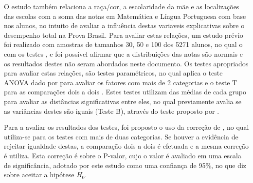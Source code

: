 O estudo também relaciona a raça/cor, a escolaridade da mãe e as localizações das escolas com a soma das notas em Matemática 
e Língua Portuguesa com base nos alunos, no intuito de avaliar a influência destas variaveis explicativas sobre o desempenho
total na Prova Brasil. Para avaliar estas relações, um estudo prévio foi realizado com amostras de tamanhos 30, 50 e 100 dos 5271
alunos, no qual o com os testes ,  e 
foi possivel afirmar que a distribuições das notas são normais e os resultados destes não seram abordados neste documento. Os testes 
apropriados para avaliar estas relações, são testes paramétricos, no qual aplica o teste ANOVA dado por  para 
avaliar os fatores com mais de 2 categorias e o teste T para as comparações dois a dois \cite{o1908student}.
Estes testes utilizam das médias de cada grupo para avaliar as distâncias significativas entre eles, no qual previamente avalia se as
variâncias destes são iguais (Teste B), através do teste proposto por .

Para a avaliar os resultados dos testes, foi proposto o uso da correção de , no qual utiliza-se para os 
testes com mais de duas categorias. Se houver a evidência de rejeitar igualdade destas, a comparação dois a dois é efetuada e a mesma correção
é utiliza. Esta correção é sobre o P-valor, cujo o valor é avaliado em uma escala de significância, adotado por este estudo
como uma confiança de 95\%, no que diz sobre aceitar a hipótese $H_0$.